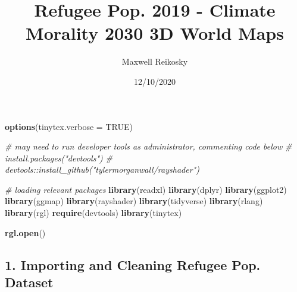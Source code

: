 \documentclass[
]{article}
\title{Refugee Pop. 2019 - Climate Morality 2030 3D World Maps}
\author{Maxwell Reikosky}
\date{12/10/2020}
\newenvironment{Shaded}{\begin{snugshade}}{\end{snugshade}}
\newcommand{\CommentTok}[1]{\textcolor[rgb]{0.56,0.35,0.01}{\textit{#1}}}
\newcommand{\DataTypeTok}[1]{\textcolor[rgb]{0.13,0.29,0.53}{#1}}
\newcommand{\KeywordTok}[1]{\textcolor[rgb]{0.13,0.29,0.53}{\textbf{#1}}}
\newcommand{\NormalTok}[1]{#1}
\newcommand{\OperatorTok}[1]{\textcolor[rgb]{0.81,0.36,0.00}{\textbf{#1}}}
\newcommand{\OtherTok}[1]{\textcolor[rgb]{0.56,0.35,0.01}{#1}}
\begin{document}
\maketitle

\begin{Shaded}
\end{Shaded}

\begin{Shaded}
\begin{Highlighting}[]
\KeywordTok{options}\NormalTok{(}\DataTypeTok{tinytex.verbose =} \OtherTok{TRUE}\NormalTok{)}
\end{Highlighting}
\end{Shaded}

\begin{Shaded}
\begin{Highlighting}[]
\CommentTok{# may need to run developer tools as administrator, commenting code below}
\CommentTok{# install.packages("devtools") }
\CommentTok{# devtools::install_github("tylermorganwall/rayshader")}

\CommentTok{# loading relevant packages}
\KeywordTok{library}\NormalTok{(readxl)}
\KeywordTok{library}\NormalTok{(dplyr)}
\KeywordTok{library}\NormalTok{(ggplot2)}
\KeywordTok{library}\NormalTok{(ggmap)}
\KeywordTok{library}\NormalTok{(rayshader)}
\KeywordTok{library}\NormalTok{(tidyverse)}
\KeywordTok{library}\NormalTok{(rlang)}
\KeywordTok{library}\NormalTok{(rgl)}
\KeywordTok{require}\NormalTok{(devtools)}
\KeywordTok{library}\NormalTok{(tinytex)}


\KeywordTok{rgl.open}\NormalTok{()}
\end{Highlighting}
\end{Shaded}

\hypertarget{importing-and-cleaning-refugee-pop.-dataset}{%
\subsection{1. Importing and Cleaning Refugee Pop.
Dataset}\label{importing-and-cleaning-refugee-pop.-dataset}}
\end{document}
